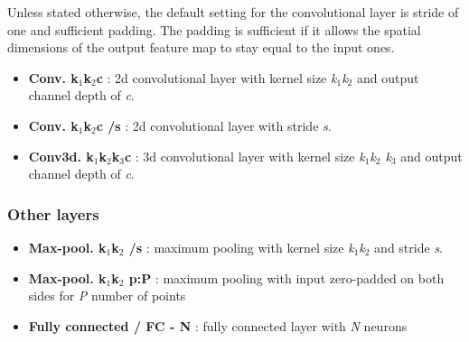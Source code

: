 Unless stated otherwise, the default setting for the convolutional layer is stride of one and sufficient padding. The padding is sufficient if it allows the spatial dimensions of the output feature map to stay equal to the input ones.

\begin{itemize}
    \item \textbf{Conv. k$_1$\x k$_2$\x c} : 2d convolutional layer with kernel size \textit{k$_1$\x k$_2$} and output channel depth of \textit{c}.
    
    \item \textbf{Conv. k$_1$\x k$_2$\x c /s} : 2d convolutional layer with stride \textit{s}.
    
    \item \textbf{Conv3d. k$_1$\x k$_2$\x k$_3$\x c} : 3d convolutional layer with kernel size \textit{k$_1$\x k$_2$ \x k$_3$} and output channel depth of \textit{c}. 
\end{itemize}

\subsubsection*{Other layers}
\begin{itemize}
    \item \textbf{Max-pool. k$_1$\x k$_2$ /s} : maximum pooling with kernel size \textit{k$_1$\x k$_2$} and stride \textit{s}.
    
    \item \textbf{Max-pool. k$_1$\x k$_2$ p:P} : maximum pooling with
 input zero-padded on both sides for \textit{P} number of points
 
    \item \textbf{Fully connected / FC - N} : fully connected layer with \textit{N} neurons
\end{itemize}
